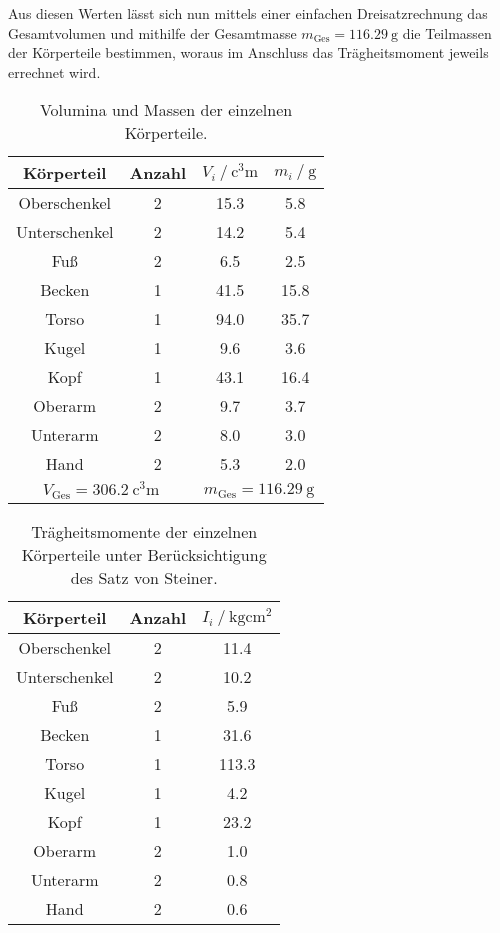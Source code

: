 Aus diesen Werten lässt sich nun mittels einer einfachen Dreisatzrechnung das Gesamtvolumen und mithilfe der Gesamtmasse ${m_\text{Ges}=\SI{116.29}{\gram}}$ 
die Teilmassen der Körperteile bestimmen, woraus im Anschluss das Trägheitsmoment jeweils errechnet wird. 

\begin{table}
\centering
\caption{Volumina und Massen der einzelnen Körperteile.}
\label{tab:mass_vol}
\begin{tabular}{c c S[table-format=2.1] S[table-format=2.1]}
    \toprule
    {Körperteil} & {Anzahl} & {$V_i\:/\:\si{\cubic\centi\meter}$} & {$m_i\:/\:\si{\gram}$} \\
    \midrule
    Oberschenkel    & 2 & 15.3 &  5.8 \\
    Unterschenkel   & 2 & 14.2 &  5.4 \\
    Fuß             & 2 &  6.5 &  2.5 \\
    Becken          & 1 & 41.5 & 15.8 \\
    Torso           & 1 & 94.0 & 35.7 \\
    Kugel           & 1 &  9.6 &  3.6 \\
    Kopf            & 1 & 43.1 & 16.4 \\
    Oberarm         & 2 &  9.7 &  3.7 \\
    Unterarm        & 2 &  8.0 &  3.0 \\
    Hand            & 2 &  5.3 &  2.0 \\
    \midrule
     &  \\
    \bottomrule
\end{tabular}
\end{table}

\begin{table}
\centering
\caption{Trägheitsmomente der einzelnen Körperteile unter Berücksichtigung des Satz von Steiner.}
\label{tab:traegh}
\begin{tabular}{c c S[table-format=3.1]}
    \toprule
    {Körperteil} & {Anzahl} & {$I_i\:/\:\si{\kilo\gram\centi\meter\squared}$} \\
    \midrule
    Oberschenkel    & 2 &  11.4 \\
    Unterschenkel   & 2 &  10.2 \\
    Fuß             & 2 &   5.9 \\
    Becken          & 1 &  31.6 \\
    Torso           & 1 & 113.3 \\
    Kugel           & 1 &   4.2 \\
    Kopf            & 1 &  23.2 \\
    Oberarm         & 2 &   1.0 \\
    Unterarm        & 2 &   0.8 \\
    Hand            & 2 &   0.6 \\
    \bottomrule
\end{tabular}
\end{table}

